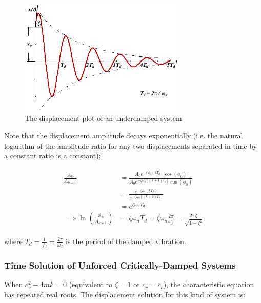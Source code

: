 \documentclass[10pt,b5paper,titlepage]{book}
\newenvironment{ematrix}
{
    \begin{eqnarray}
        \begin{aligned}
}
{
        \end{aligned}
    \end{eqnarray}
}
\begin{document}
\begin{figure}[ht]
    \centering
    \includegraphics[width=0.70\textwidth]{img/SDOF_UnderDamped_Response.png}
    \caption{The displacement plot of an underdamped system}
    \label{fig:SDOF-underdamped-response-png}
\end{figure}

Note that the displacement amplitude decays exponentially (i.e. the natural
logarithm of the amplitude ratio for any two displacements separated in time
by a constant ratio is a constant):

\begin{ematrix}
    \frac{A_k}{A_{k+1}} &=
    \frac{A_0 e^{-\zeta \omega_n \left( k T_d \right)} \cos{ \left( \phi_0 \right) }}
         {A_0 e^{-\zeta \omega_n \left[ (k+1) T_d \right]} \cos{ \left( \phi_0 \right) }}\\
                        &=
    \frac{e^{-\zeta \omega_n \left( k T_d \right)}}
         {e^{-\zeta \omega_n \left[ (k+1) T_d \right]}}\\
                        &= e^{\zeta \omega_n T_d}\\
    \implies \ln{\left( \frac{A_k}{A_{k+1}} \right)} &=
    \zeta \omega_n T_d = \zeta \omega_n \frac{2 \pi}{\omega_d}
    = \frac{2 \pi \zeta}{\sqrt{1 - \zeta^2}}
\end{ematrix}

where $ T_d = \frac{1}{f_d} = \frac{2 \pi}{\omega_d} $ is the period of the
damped vibration.


\subsubsection{Time Solution of Unforced Critically-Damped Systems}

When $ c_v^2 - 4 m k = 0 $ (equivalent to $ \zeta = 1 $ or $ c_v = c_c $), the
characteristic equation has repeated real roots. The displacement solution for
this kind of system is:
\end{document}
